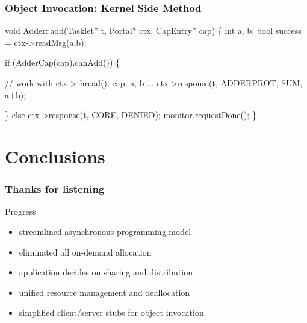 \documentclass[9pt]{beamer}
\begin{document}
\begin{frame}[fragile]
  \frametitle{Object Invocation: Kernel Side Method}
    \begin{semiverbatim}
void Adder::add(Tasklet* t, Portal* ctx, CapEntry* cap) \{
  int a, b;
  bool success = \alert{ctx->readMsg(a,b);}

  if (\alert{AdderCap(cap).canAdd()}) \{ 

    // work with ctx->thread(), cap, a, b ...
    \alert{ctx->response(t, ADDERPROT, SUM, a+b);}

  \} else ctx->response(t, CORE, DENIED); 
  monitor.requestDone();
\}\end{semiverbatim}
\end{frame}


\section*{Conclusions}

\begin{frame}
\frametitle{Thanks for listening}
\begin{block}{Progress}
\begin{itemize}
\item streamlined asynchronous programming model
\item eliminated all on-demand allocation
\item application decides on sharing and distribution
\item unified resource management and deallocation
\item simplified client/server stubs for object invocation
\end{itemize}
\end{block}
\end{frame}

%
%

\appendix


\end{document}
